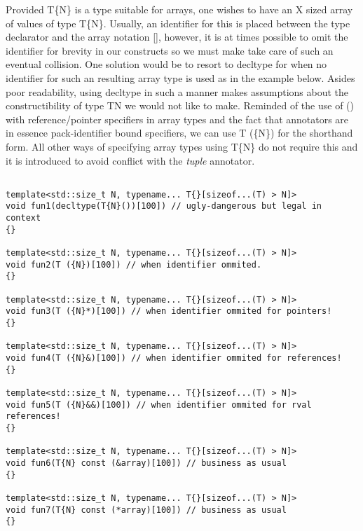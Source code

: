\p Provided T\{N\} is a type suitable for arrays, one wishes to have an X sized array of values of type T\{N\}.
Usually, an identifier for this is placed between the type declarator and the array notation [], however, it is at times possible to omit the identifier for brevity in our constructs so we must make take care of such an eventual collision.
One solution would be to resort to decltype for when no identifier for such an resulting array type is used as in the example below.
Asides poor readability, using decltype in such a manner makes assumptions about the constructibility of type T{N} we would not like to make.
Reminded of the use of () with reference/pointer specifiers in array types and the fact that annotators are in essence pack-identifier bound specifiers, we can use T (\{N\}) for the shorthand form.
All other ways of specifying array types using T\{N\} do not require this and it is introduced to avoid conflict with the \textit{tuple} annotator.

\begin{verbatim}

template<std::size_t N, typename... T{}[sizeof...(T) > N]>
void fun1(decltype(T{N}())[100]) // ugly-dangerous but legal in context
{}

template<std::size_t N, typename... T{}[sizeof...(T) > N]>
void fun2(T ({N})[100]) // when identifier ommited.
{}

template<std::size_t N, typename... T{}[sizeof...(T) > N]>
void fun3(T ({N}*)[100]) // when identifier ommited for pointers!
{}

template<std::size_t N, typename... T{}[sizeof...(T) > N]>
void fun4(T ({N}&)[100]) // when identifier ommited for references!
{}

template<std::size_t N, typename... T{}[sizeof...(T) > N]>
void fun5(T ({N}&&)[100]) // when identifier ommited for rval references!
{}

template<std::size_t N, typename... T{}[sizeof...(T) > N]>
void fun6(T{N} const (&array)[100]) // business as usual
{}

template<std::size_t N, typename... T{}[sizeof...(T) > N]>
void fun7(T{N} const (*array)[100]) // business as usual
{}
\end{verbatim}
